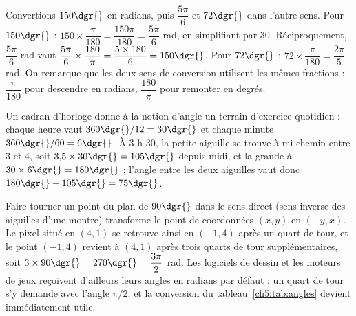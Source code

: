 \begin{exemple}
Convertions $150\dgr{}$ en radians, puis $\dfrac{5\pi}{6}$ et $72\dgr{}$ dans l'autre sens. Pour $150\dgr{}$ : $150 \times \dfrac{\pi}{180} = \dfrac{150\pi}{180} = \dfrac{5\pi}{6}$ rad, en simplifiant par 30. Réciproquement, $\dfrac{5\pi}{6}$ rad vaut $\dfrac{5\pi}{6} \times \dfrac{180}{\pi} = \dfrac{5 \times 180}{6} = 150\dgr{}$. Pour $72\dgr{}$ : $72 \times \dfrac{\pi}{180} = \dfrac{2\pi}{5}$ rad. On remarque que les deux sens de conversion utilisent les mêmes fractions : $\dfrac{\pi}{180}$ pour descendre en radians, $\dfrac{180}{\pi}$ pour remonter en degrés.
\end{exemple}

Un cadran d'horloge donne à la notion d'angle un terrain d'exercice quotidien : chaque heure vaut $360\dgr{} / 12 = 30\dgr{}$ et chaque minute $360\dgr{} / 60 = 6\dgr{}$. À $3$ h $30$, la petite aiguille se trouve à mi-chemin entre 3 et 4, soit $3{,}5 \times 30\dgr{} = 105\dgr{}$ depuis midi, et la grande à $30 \times 6\dgr{} = 180\dgr{}$ ; l'angle entre les deux aiguilles vaut donc $180\dgr{} - 105\dgr{} = 75\dgr{}$.

\begin{exemple}
Faire tourner un point du plan de $90\dgr{}$ dans le sens direct (sens inverse des aiguilles d'une montre) transforme le point de coordonnées $(x, y)$ en $(-y, x)$. Le pixel situé en $(4, 1)$ se retrouve ainsi en $(-1, 4)$ après un quart de tour, et le point $(-1, 4)$ revient à $(4, 1)$ après trois quarts de tour supplémentaires, soit $3 \times 90\dgr{} = 270\dgr{} = \dfrac{3\pi}{2}$ rad. Les logiciels de dessin et les moteurs de jeux reçoivent d'ailleurs leurs angles en radians par défaut : un quart de tour s'y demande avec l'angle $\pi/2$, et la conversion du tableau~\ref{ch5:tab:angles} devient immédiatement utile.
\end{exemple}

